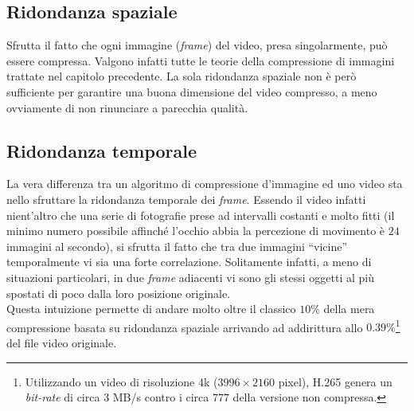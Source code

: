
\subsection{Ridondanza spaziale}

Sfrutta il fatto che ogni immagine (\emph{frame}) del video, presa 
singolarmente, può essere compressa. Valgono infatti tutte le teorie della 
compressione di immagini trattate nel capitolo precedente.
La sola ridondanza spaziale non è però sufficiente per garantire una buona 
dimensione del video compresso, a meno ovviamente di non rinunciare a parecchia 
qualità.


\subsection{Ridondanza temporale}

La vera differenza tra un algoritmo di compressione d'immagine ed uno video sta 
nello sfruttare la ridondanza temporale dei \emph{frame}. Essendo il video 
infatti nient'altro che una serie di fotografie prese ad intervalli costanti e 
molto fitti (il minimo numero possibile affinché l'occhio abbia la percezione 
di movimento è $24$ immagini al secondo), si sfrutta il fatto che tra due 
immagini ``vicine'' temporalmente vi sia una forte correlazione. Solitamente 
infatti, a meno di situazioni particolari, in due \emph{frame} adiacenti vi 
sono gli stessi oggetti al più spostati di poco dalla loro posizione 
originale.\\

Questa intuizione permette di andare molto oltre il classico $10\%$ della mera 
compressione basata su ridondanza spaziale arrivando ad addirittura allo 
$0.39\%$\footnote{Utilizzando un video di risoluzione 4k ($3996\times2160$ 
pixel), H.265 genera un \emph{bit-rate} di circa $3$ MB/s contro i circa $777$ 
della versione non compressa.} del file video originale. 


